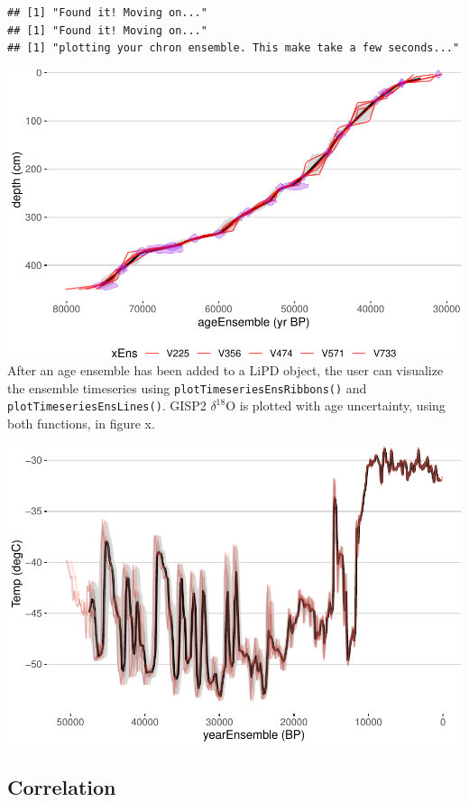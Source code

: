 \documentclass[gc, manuscript]{copernicus}
\begin{document}
\begin{verbatim}
## [1] "Found it! Moving on..."
## [1] "Found it! Moving on..."
## [1] "plotting your chron ensemble. This make take a few seconds..."
\end{verbatim}

\includegraphics{geoChronR-paper_files/figure-latex/unnamed-chunk-3-1.pdf}
After an age ensemble has been added to a LiPD object, the user can
visualize the ensemble timeseries using
\texttt{plotTimeseriesEnsRibbons()} and
\texttt{plotTimeseriesEnsLines()}. GISP2 \(\delta^{18}\)O is plotted
with age uncertainty, using both functions, in figure x.

\includegraphics{geoChronR-paper_files/figure-latex/unnamed-chunk-5-1.pdf}

\subsection{Correlation}
\end{document}
